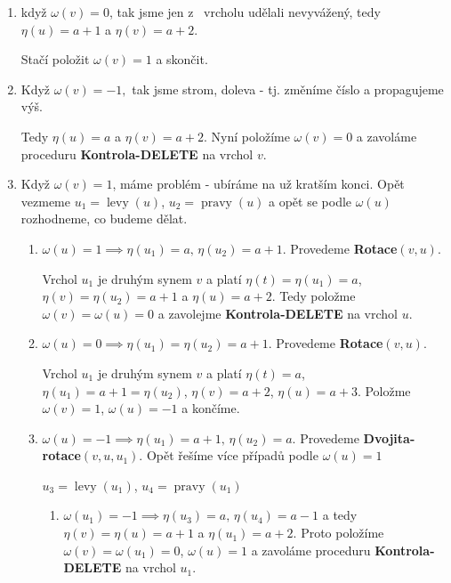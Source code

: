 \documentclass[a4paper,12pt]{article}
\DeclareMathOperator*{\levy}{levy}
\DeclareMathOperator*{\pravy}{pravy}
\begin{document}
\begin{enumerate}
    \item  když $\omega (v)=0$, tak jsme jen z~ vrcholu udělali nevyvážený, tedy $\eta (u)=a+1$ a $\eta (v)=a+2$. 
    
    Stačí položit $\omega (v)=1$ a skončit.
    \item Když $\omega (v)=-1,$ tak jsme strom,  doleva  - tj. změníme číslo a propagujeme výš.
    
    Tedy  $\eta (u)=a$ a $\eta (v)=a+2$. 
    Nyní položíme $\omega (v)=0$ a 
    zavoláme proceduru {\bf Kontrola-DELETE} na vrchol $v$.
    
    \item Když $\omega (v)=1$, máme problém - ubíráme na už kratším konci. Opět vezmeme $u_1=\levy(u)$, $u_2=\pravy(u)$ a opět se podle $\omega (u)$ rozhodneme, co budeme dělat.
    \begin{enumerate}
        \item $\omega (u)=1\implies\eta (u_1)=a,\,\eta (u_2)=a+1$.  Provedeme 
        {\bf Rotace$(v,u)$}.  
        
        Vrchol $u_1$ je druhým synem $v$ a platí $\eta (t)=\eta (u_
        1)=a$, 
        $\eta (v)=\eta (u_2)=a+1$ a $\eta (u)=a+2$.  Tedy položme $\omega 
        (v)=\omega (u)=0$ a 
        zavolejme {\bf Kontrola-DELETE} na vrchol $u$.
        
        \item $\omega (u)=0\implies\eta (u_1)=\eta (u_2)=a+1$. Provedeme 
        {\bf Rotace$(v,u)$}. 
        
        Vrchol $u_1$ je druhým synem $v$ a platí 
        $\eta (t)=a$, $\eta (u_1)=a+1=\eta (u_2)$, $\eta (v)=a+2$, $\eta 
        (u)=a+3$. Položme 
        $\omega (v)=1$, $\omega (u)=-1$ a končíme.
        \item $\omega (u)=-1\implies\eta (u_1)=a+1,\,\eta (u_2)=a$.  Provedeme 
        {\bf Dvojita-rotace$(v,u,u_1)$}. Opět řešíme více případů podle $\omega (u)=1$
        
        $u_3=\levy(u_1)$, 
        $u_4=\pravy(u_1)$
        
        \begin{enumerate}
            \item $\omega (u_1)=-1\implies\eta (u_3)=a,\,\eta (u_4)=a-1$ a tedy 
            $\eta (v)=\eta (u)=a+1$ a $\eta (u_1)=a+2$. Proto položíme 
            $\omega (v)=\omega (u_1)=0$, $\omega (u)=1$ a zavoláme proceduru {\bf Kontrola-DELETE }
            na vrchol $u_1$.
            

\end{enumerate}
\end{enumerate}
\end{enumerate}
\end{document}
